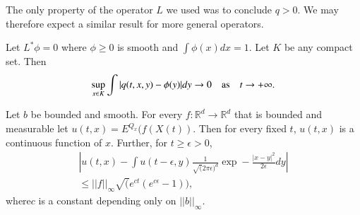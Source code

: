 \begin{remark*}
The only property of the operator $L$ we used was to conclude
$q>0$. We may therefore expect a similar result for more general operators.
\end{remark*}

\begin{theorem*}
Let $L^{*}\phi=0$ where $\phi\geq 0$ is smooth and
$\int\phi(x)dx=1$. Let $K$ be any compact set. Then
$$
\sup\limits_{x\in K}\int|q(t,x,y)-\phi(y)|dy\to 0\quad\text{as}\quad t\to +\infty.
$$
\end{theorem*}

\setcounter{lemma}{0}
\begin{lemma}\label{chap31-lem1}
Let $b$ be bounded and smooth. For every $f:\mathbb{R}^{d}\to
\mathbb{R}^{d}$ that is bounded and measurable let
$u(t,x)=E^{Q_{x}}(f(X(t))$. Then for every fixed $t$, $u(t,x)$ is a
continuous function of $x$. Further, for $t\geq \epsilon >0$,
\begin{gather*}
|u(t,x)-\int u(t-\epsilon,y)\frac{1}{\surd (2\pi \epsilon)^{d}}\exp
-\frac{|x-y|^{2}}{2\epsilon}dy|\\
\leq ||f||_{\infty}\surd (e^{ct}(e^{c\epsilon}-1)),
\end{gather*}
where\pageoriginale $c$ is a constant depending only on $||b||_{\infty}$.
\end{lemma}


